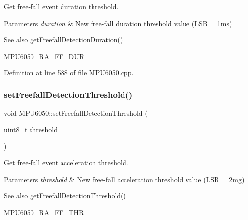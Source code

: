 Get free-\/fall event duration threshold. 
\begin{DoxyParams}{Parameters}
{\em duration} & New free-\/fall duration threshold value (L\+SB = 1ms) \\
\hline
\end{DoxyParams}
\begin{DoxySeeAlso}{See also}
\mbox{\hyperlink{classMPU6050_a3cff6b9613ad01aa1a51c287f5c5e329}{get\+Freefall\+Detection\+Duration()}} 

\mbox{\hyperlink{MPU6050_8h_aaf242278f1dd87556bdeeab589b01fd7}{M\+P\+U6050\+\_\+\+R\+A\+\_\+\+F\+F\+\_\+\+D\+UR}} 
\end{DoxySeeAlso}


Definition at line 588 of file M\+P\+U6050.\+cpp.


\begin{DoxyCode}{0}

\end{DoxyCode}
\mbox{\label{classMPU6050_af704e1a4eb01522b146abeba78c32716}} 
\subsubsection{\texorpdfstring{setFreefallDetectionThreshold()}{setFreefallDetectionThreshold()}}
{\footnotesize\ttfamily void M\+P\+U6050\+::set\+Freefall\+Detection\+Threshold (\begin{DoxyParamCaption}\item[{uint8\+\_\+t}]{threshold }\end{DoxyParamCaption})}

Get free-\/fall event acceleration threshold. 
\begin{DoxyParams}{Parameters}
{\em threshold} & New free-\/fall acceleration threshold value (L\+SB = 2mg) \\
\hline
\end{DoxyParams}
\begin{DoxySeeAlso}{See also}
\mbox{\hyperlink{classMPU6050_ac7f5c0511fe9d0f3525a3757498daed7}{get\+Freefall\+Detection\+Threshold()}} 

\mbox{\hyperlink{MPU6050_8h_a391a4a95c33895c6926b9459cea5f3cd}{M\+P\+U6050\+\_\+\+R\+A\+\_\+\+F\+F\+\_\+\+T\+HR}} 
\end{DoxySeeAlso}


